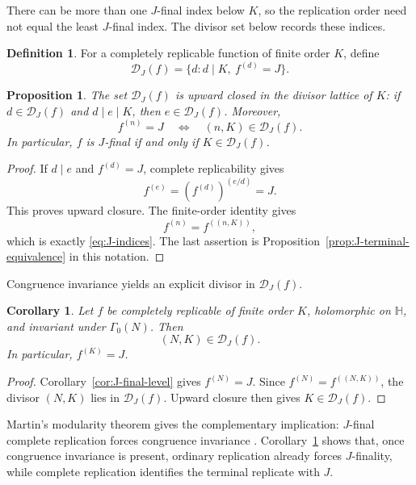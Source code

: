 \documentclass[12pt]{amsart}
\newtheorem{prop}[thm]{Proposition}
\newtheorem{cor}[thm]{Corollary}
\theoremstyle{definition}
\newtheorem{defn}[thm]{Definition}
\theoremstyle{remark}
\numberwithin{equation}{section}
\newcommand{\Hh}{\mathbb H}
\begin{document}
There can be more than one $J$-final index below $K$, so the replication order need not equal the least $J$-final index. The divisor set below records these indices.

\begin{defn}\label{def:J-divisors}
For a completely replicable function of finite order $K$, define
\[
\mathcal D_J(f)=\{d:d\mid K,\ f^{(d)}=J\}.
\]
\end{defn}

\begin{prop}\label{prop:J-divisor-filter}
The set $\mathcal D_J(f)$ is upward closed in the divisor lattice of $K$: if $d\in\mathcal D_J(f)$ and $d\mid e\mid K$, then $e\in\mathcal D_J(f)$. Moreover,
\begin{equation}\label{eq:J-indices}
f^{(n)}=J
\quad\Longleftrightarrow\quad
(n,K)\in\mathcal D_J(f).
\end{equation}
In particular, $f$ is $J$-final if and only if $K\in\mathcal D_J(f)$.
\end{prop}

\begin{proof}
If $d\mid e$ and $f^{(d)}=J$, complete replicability gives
\[
f^{(e)}=\left(f^{(d)}\right)^{(e/d)}=J.
\]
This proves upward closure. The finite-order identity gives
\[
f^{(n)}=f^{((n,K))},
\]
which is exactly \eqref{eq:J-indices}. The last assertion is Proposition~\ref{prop:J-terminal-equivalence} in this notation.
\end{proof}

Congruence invariance yields an explicit divisor in $\mathcal D_J(f)$.

\begin{cor}\label{cor:congruence-J-divisor}
Let $f$ be completely replicable of finite order $K$, holomorphic on $\Hh$, and invariant under $\Gamma_0(N)$. Then
\begin{equation}\label{eq:gcd-J-divisor}
(N,K)\in\mathcal D_J(f).
\end{equation}
In particular, $f^{(K)}=J$.
\end{cor}

\begin{proof}
Corollary~\ref{cor:J-final-level} gives $f^{(N)}=J$. Since $f^{(N)}=f^{((N,K))}$, the divisor $(N,K)$ lies in $\mathcal D_J(f)$. Upward closure then gives $K\in\mathcal D_J(f)$.
\end{proof}

Martin's modularity theorem gives the complementary implication: $J$-final complete replication forces congruence invariance \cite{martin}. Corollary~\ref{cor:congruence-J-divisor} shows that, once congruence invariance is present, ordinary replication already forces $J$-finality, while complete replication identifies the terminal replicate with $J$.
\end{document}
